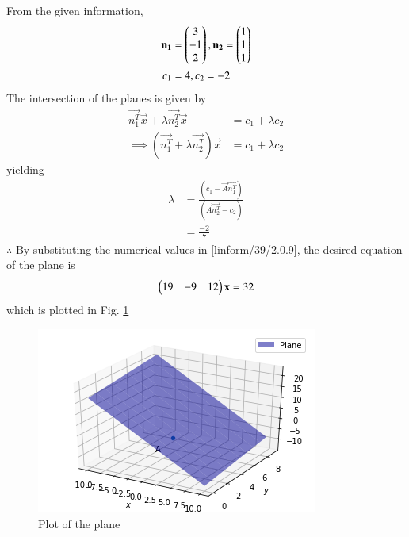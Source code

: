 
From the given information, 
\begin{align}
\mathbf{n_1}&=\begin{pmatrix}3 \\ -1 \\ 2\end{pmatrix},\mathbf{n_2}=\begin{pmatrix}1 \\ 1 \\ 1\end{pmatrix}
\\
c_1&=4,c_2=-2
\end{align}
The intersection of the planes is given by 
\begin{align}
\vec{n_1^T}\vec{x} + \lambda\vec{n_2^T}\vec{x}  &= c_1+\lambda c_2  \\ 
\implies (\vec{n_1^T}+\lambda\vec{n_2^T})\vec{x} &= c_1+\lambda c_2 \label{linform/39/2.0.9}
\end{align}
yielding 
\begin{align}
\lambda&=\frac{(c_1-\vec{A}\vec{n_1^T})}{(\vec{A}\vec{n_2^T}-c_2)} \\
 &= \frac{-2}{7}
\end{align}
$\therefore $ By substituting the numerical values in  \eqref{linform/39/2.0.9}, the desired  equation of the plane is 
\begin{align}
\begin{pmatrix}19 & -9 & 12\end{pmatrix}\mathbf{x} = 32 
\end{align}
which is plotted in Fig. \ref{linform/39/Plot of the plane}
%
\begin{figure}[!ht]
\centering
\includegraphics[width=\columnwidth]{solutions/su2021/2/39/Plane_plot.png}
\caption{Plot of the plane}
\label{linform/39/Plot of the plane}
\end{figure}

